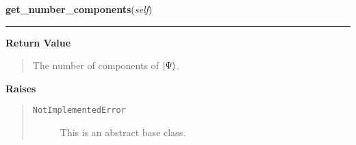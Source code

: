 \hspace{.8\funcindent}\begin{boxedminipage}{\funcwidth}

    \raggedright \textbf{get\_number\_components}(\textit{self})

    \vspace{-1.5ex}

    \rule{\textwidth}{0.5\fboxrule}
\setlength{\parskip}{2ex}
\setlength{\parskip}{1ex}
      \textbf{Return Value}
    \vspace{-1ex}

      \begin{quote}
      The number of components of
      $\Ket{\Psi}$.

      \end{quote}

      \textbf{Raises}
    \vspace{-1ex}

      \begin{quote}
        \begin{description}

          \item[\texttt{NotImplementedError}]

          This is an abstract base class.

        \end{description}

      \end{quote}

    \end{boxedminipage}

    \label{Propagator:Propagator:get_potential}

    \vspace{0.5ex}


